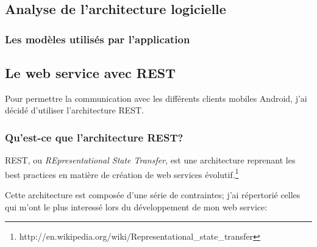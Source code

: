 \documentclass[12pt,table,a4paper]{report}
\begin{document}
\subsection{Analyse de l'architecture logicielle}

\subsubsection{Les modèles utilisés par l'application}
\todo{}


\subsection{Le web service avec REST}
Pour permettre la communication avec les différents clients mobiles Android, j'ai décidé d'utiliser l'architecture REST.

\subsubsection{Qu'est-ce que l'architecture REST?}
REST, ou \textit{REpresentational State Transfer}, est une architecture reprenant les best practices en matière de création de web services évolutif.\footnote{http://en.wikipedia.org/wiki/Representational\_state\_transfer}

Cette architecture est composée d'une série de contraintes; j'ai répertorié celles qui m'ont le plus interessé lors du développement de mon web service:
\end{document}

